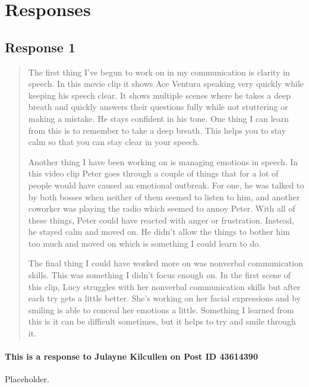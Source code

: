 
\section{Responses}
  \subsection{Response 1}
    \begin{quotation}
      The first thing I've begun to work on in my communication is clarity in
        speech. In this movie clip it shows Ace Ventura speaking very quickly
        while keeping his speech clear. It shows multiple scenes where he takes
        a deep breath and quickly answers their questions fully while not
        stuttering or making a mistake. He stays confident in his tone. One
        thing I can learn from this is to remember to take a deep breath. This
        helps you to stay calm so that you can stay clear in your speech.

      Another thing I have been working on is managing emotions in speech. In
        this video clip Peter goes through a couple of things that for a lot of
        people would have caused an emotional outbreak. For one, he was talked
        to by both bosses when neither of them seemed to listen to him, and
        another coworker was playing the radio which seemed to annoy Peter.
        With all of these things, Peter could have reacted with anger or
        frustration. Instead, he stayed calm and moved on. He didn't allow the
        things to bother him too much and moved on which is something I could
        learn to do.

      The final thing I could have worked more on was nonverbal communication
        skills. This was something I didn't focus enough on. In the first scene
        of this clip, Lucy struggles with her nonverbal communication skills
        but after each try gets a little better. She's working on her facial
        expressions and by smiling is able to conceal her emotions a little.
        Something I learned from this is it can be difficult sometimes, but it
        helps to try and smile through it.
    \end{quotation}

    \paragraph{This is a response to Julayne Kilcullen on Post ID 43614390}
      Placeholder.
